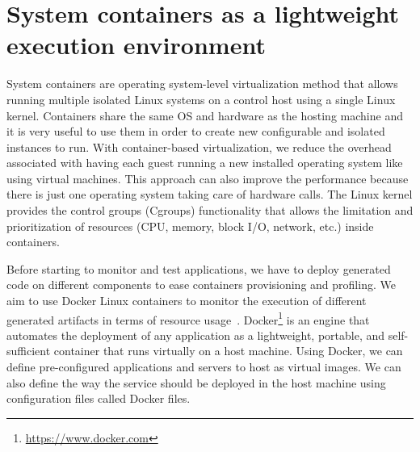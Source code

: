 \fi
\section{System containers as a lightweight execution environment}

System containers are operating system-level virtualization method that allows running multiple isolated Linux systems on a control host using a single Linux kernel. 
Containers share the same OS and hardware as the hosting machine and it is very useful to use them in order to create new configurable and isolated instances to run. 
With container-based virtualization, we reduce the overhead associated with having each guest running a new installed operating system like using virtual machines. This approach can also improve the performance because there is just one operating system taking care of hardware calls.
The Linux kernel provides the control groups (Cgroups) functionality that allows the limitation and prioritization of resources (CPU, memory, block I/O, network, etc.) inside containers. 





Before starting to monitor and test applications, we have to deploy generated code on different components to ease containers provisioning and profiling. 
We aim to use Docker Linux containers to monitor the execution of different generated artifacts in terms of resource usage~\cite{merkel2014docker}. 
Docker\footnote{\url{https://www.docker.com}} is an engine that automates the deployment of any application as a lightweight, portable, and self-sufficient container that runs virtually on a host machine. 
Using Docker, we can define pre-configured applications and servers to host as virtual images. We can also define the way the service should be deployed in the host machine using configuration files called Docker files. 
